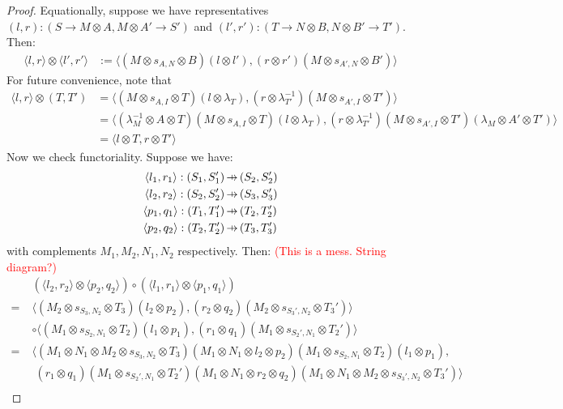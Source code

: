 \documentclass[11pt,a4paper]{article}
\theoremstyle{plain}
\theoremstyle{definition}
\newcommand{\hto}{\ensuremath{\,\mathaccent\shortmid\rightarrow\,}}
\newcommand{\todo}[1]{\textcolor{red}{\small #1}}
\begin{document}
\begin{proof}
Equationally, suppose we have representatives $(l, r) : (S \to M \otimes A, M \otimes A' \to S')$ and $(l', r') : (T \to N \otimes B, N \otimes B' \to T')$. Then:
\begin{align*}
\langle l, r \rangle \otimes \langle l', r' \rangle &:= \langle (M \otimes s_{A,N} \otimes B)(l \otimes l'), (r \otimes r')(M \otimes s_{A',N} \otimes B') \rangle
\end{align*}
For future convenience, note that 
\begin{align*}
\langle l, r \rangle \otimes (T, T') &= \langle (M \otimes s_{A,I} \otimes T)(l \otimes \lambda_T), (r \otimes \lambda^{-1}_{T'})(M \otimes s_{A',I}\otimes T') \rangle \\
&= \langle (\lambda^{-1}_M \otimes A \otimes T)(M \otimes s_{A,I} \otimes T)(l \otimes \lambda_T), (r \otimes \lambda^{-1}_{T'})(M \otimes s_{A',I}\otimes T')(\lambda_M \otimes A' \otimes T') \rangle \\
&= \langle l \otimes T, r \otimes T' \rangle
\end{align*}
Now we check functoriality. Suppose we have:
\begin{align*}
\langle l_1, r_1 \rangle : (S_1, S_1') &\hto (S_2, S_2') \\
\langle l_2, r_2 \rangle : (S_2, S_2') &\hto (S_3, S_3') \\
\langle p_1, q_1 \rangle : (T_1, T_1') &\hto (T_2, T_2') \\
\langle p_2, q_2 \rangle : (T_2, T_2') &\hto (T_3, T_3')
\end{align*}
with complements $M_1, M_2, N_1, N_2$ respectively. Then: \todo {(This is a mess. String diagram?)}
\begin{align*}
&(\langle l_2, r_2 \rangle \otimes \langle p_2, q_2 \rangle) \circ (\langle l_1, r_1 \rangle \otimes \langle p_1, q_1 \rangle) \\
= \; &\langle (M_2 \otimes s_{S_3,N_2} \otimes T_3)(l_2 \otimes p_2), (r_2 \otimes q_2)(M_2 \otimes s_{S_3',N_2} \otimes T_3') \rangle \\
&\circ \langle (M_1 \otimes s_{S_2,N_1} \otimes T_2)(l_1 \otimes p_1), (r_1 \otimes q_1)(M_1 \otimes s_{S_2',N_1} \otimes T_2') \rangle \\
= \; & \langle (M_1 \otimes N_1 \otimes M_2 \otimes s_{S_3,N_2} \otimes T_3)(M_1 \otimes N_1 \otimes l_2 \otimes p_2)(M_1 \otimes s_{S_2,N_1} \otimes T_2)(l_1 \otimes p_1), \\
&\;(r_1 \otimes q_1)(M_1 \otimes s_{S_2',N_1} \otimes T_2')(M_1 \otimes N_1 \otimes r_2 \otimes q_2)(M_1 \otimes N_1 \otimes M_2 \otimes s_{S_3',N_2} \otimes T_3') \rangle \\

\end{align*}
\end{proof}
\end{document}
